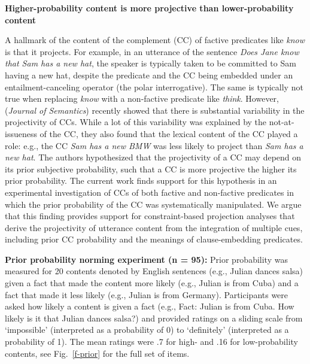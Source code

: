 \documentclass[12pt,fleqn]{article}
\newcommand{\6}{\mbox{$[\hspace*{-.6mm}[$}}
\newcommand{\9}{\mbox{$]\hspace*{-.6mm}]$}}
\begin{document}
  
\begin{center}
{\bf Higher-probability content is more projective than lower-probability content}
\end{center}

\vspace*{-.3cm}

\noindent
A hallmark of the content of the complement (CC) of factive predicates like {\em know}  is that it projects. For example, in an utterance of the sentence \emph{Does Jane know that Sam has a new hat}, the speaker is typically taken to be committed to Sam having a new hat, despite the predicate and the CC being embedded under an entailment-canceling operator (the polar interrogative). The same is typically not true when replacing \emph{know} with a non-factive predicate like \emph{think}. However,  \citealt*{tbd-variability} ({\em Journal of Semantics})  recently showed that there is substantial variability in the projectivity of CCs. While a lot of this variability was explained by the not-at-issueness of the CC, they also found that the lexical content of the CC played a role: e.g., the CC \emph{Sam has a new BMW} was less likely to project than \emph{Sam has a new hat}. The authors hypothesized that the projectivity of a CC may depend on its prior subjective probability, such that a CC is more projective the higher its prior probability. The current work finds support for this hypothesis in an experimental investigation of CCs of both factive and non-factive predicates in which the prior probability of the CC was systematically manipulated. We argue that this finding provides support for constraint-based projection analyses that derive the projectivity of utterance content from the integration of multiple cues, including prior CC probability and the meanings of clause-embedding predicates.


\noindent
{\bf Prior probability norming experiment (n = 95):} Prior probability was measured for 20 contents denoted by English sentences (e.g., Julian dances salsa) given a fact that made the content more likely (e.g., Julian is from Cuba) and a fact that made it less likely (e.g., Julian is from Germany). Participants were asked how likely a content is given a fact (e.g., Fact: Julian is from Cuba. How likely is it that Julian dances salsa?) and provided ratings on a sliding scale from `impossible' (interpreted as a probability of 0) to `definitely' (interpreted as a probability of 1). The mean ratings were .7 for high- and .16 for low-probability contents, see Fig.~\ref{f-prior} for the full set of items.
\end{document}
